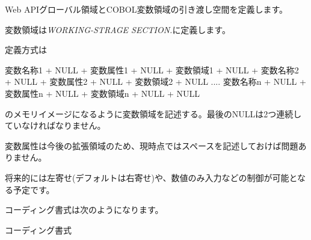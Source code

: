 
Web APIグローバル領域とCOBOL変数領域の引き渡し空間を定義します。

変数領域は{\it WORKING-STRAGE SECTION.}に定義します。

定義方式は

変数名称1 + NULL + 変数属性1 + NULL + 変数領域1 + NULL + 変数名称2 + NULL + 変数属性2 + NULL + 変数領域2 + NULL .... 変数名称n + NULL + 変数属性n + NULL + 変数領域n + NULL + NULL

のメモリイメージになるように変数領域を記述する。最後のNULLは2つ連続していなければなりません。


変数属性は今後の拡張領域のため、現時点ではスペースを記述しておけば問題ありません。

将来的には左寄せ(デフォルトは右寄せ)や、数値のみ入力などの制御が可能となる予定です。

コーディング書式は次のようになります。

{\gt コーディング書式}


